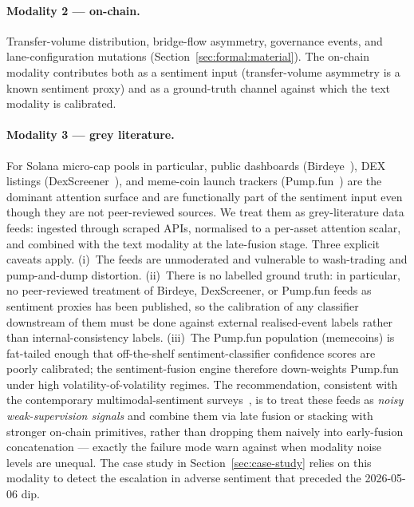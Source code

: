 \documentclass[11pt,a4paper]{article}
\begin{document}
\paragraph{Modality 2 --- on-chain.} Transfer-volume distribution, bridge-flow
asymmetry, governance events, and lane-configuration mutations
(Section~\ref{sec:formal:material}). The on-chain modality contributes both as a
sentiment input (transfer-volume asymmetry is a known sentiment proxy) and as a
ground-truth channel against which the text modality is calibrated.

\paragraph{Modality 3 --- grey literature.} For Solana micro-cap pools in particular,
public dashboards (Birdeye~\cite{birdeye2026docs}), DEX listings
(DexScreener~\cite{dexscreener2026docs}), and meme-coin launch trackers
(Pump.fun~\cite{pumpfun2026site}) are the dominant attention surface and are
functionally part of the sentiment input even though they are not peer-reviewed
sources. We treat them as grey-literature data feeds: ingested through scraped APIs,
normalised to a per-asset attention scalar, and combined with the text modality at
the late-fusion stage. Three explicit caveats apply. (i)~The feeds are unmoderated and
vulnerable to wash-trading and pump-and-dump distortion. (ii)~There is no labelled
ground truth: in particular, no peer-reviewed treatment of Birdeye, DexScreener, or
Pump.fun feeds as sentiment proxies has been published, so the calibration of any
classifier downstream of them must be done against external realised-event labels
rather than internal-consistency labels. (iii)~The Pump.fun population (memecoins) is
fat-tailed enough that off-the-shelf sentiment-classifier confidence scores are poorly
calibrated; the sentiment-fusion engine therefore down-weights Pump.fun under high
volatility-of-volatility regimes. The recommendation, consistent with the contemporary
multimodal-sentiment surveys~\cite{lai2023multimodal,gandhi2023multimodal}, is to treat
these feeds as \emph{noisy weak-supervision signals} and combine them via late fusion
or stacking with stronger on-chain primitives, rather than dropping them naively into
early-fusion concatenation --- exactly the failure mode \cite{gandhi2023multimodal} warn
against when modality noise levels are unequal. The case study in
Section~\ref{sec:case-study} relies on this modality to detect the escalation in
adverse sentiment that preceded the 2026-05-06 dip.
\end{document}
